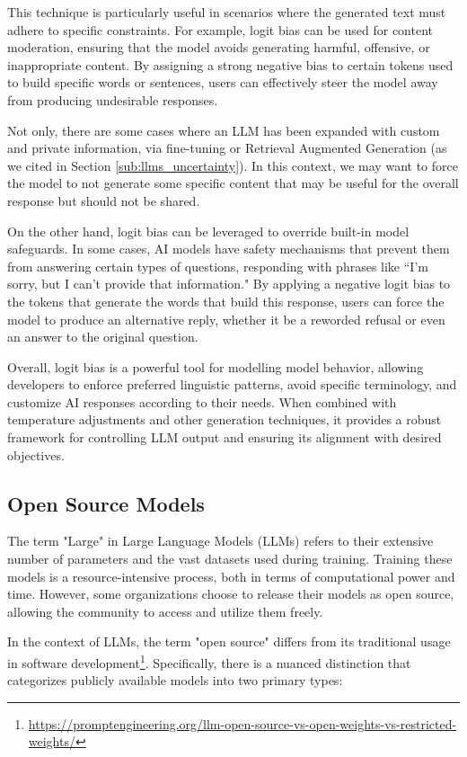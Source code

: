 This technique is particularly useful in scenarios where the generated text must
adhere to specific constraints. For example, logit bias can be used for content moderation,
ensuring that the model avoids generating harmful, offensive, or inappropriate
content. By assigning a strong negative bias to certain tokens used to build specific
words or sentences, users can effectively steer the model away from producing
undesirable responses.

Not only, there are some cases where an LLM has been expanded with custom and private
information, via fine-tuning or Retrieval Augmented Generation (as we cited in Section
\ref{sub:llms_uncertainty}). In this context, we may want to force the model to
not generate some specific content that may be useful for the overall response
but should not be shared.

On the other hand, logit bias can be leveraged to override built-in model safeguards.
In some cases, AI models have safety mechanisms that prevent them from answering
certain types of questions, responding with phrases like ``I'm sorry, but I can't
provide that information." By applying a negative logit bias to the tokens that generate
the words that build this response, users can force the model to produce an
alternative reply, whether it be a reworded refusal or even an answer to the original
question.

Overall, logit bias is a powerful tool for modelling model behavior, allowing developers
to enforce preferred linguistic patterns, avoid specific terminology, and customize
AI responses according to their needs. When combined with temperature
adjustments and other generation techniques, it provides a robust framework for controlling
LLM output and ensuring its alignment with desired objectives.

\subsection{Open Source Models}

The term "Large" in Large Language Models (LLMs) refers to their extensive
number of parameters and the vast datasets used during training. Training these models
is a resource-intensive process, both in terms of computational power and time. However,
some organizations choose to release their models as open source, allowing the community
to access and utilize them freely.

In the context of LLMs, the term "open source" differs from its traditional
usage in software development\footnote{\url{https://promptengineering.org/llm-open-source-vs-open-weights-vs-restricted-weights/}}.
Specifically, there is a nuanced distinction that categorizes publicly available
models into two primary types:

